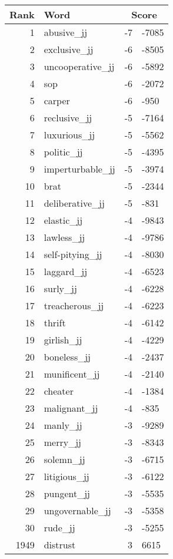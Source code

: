 \begin{longtable}[!htbp]{| rlr@{.}l |}
    \hline
    \textbf{Rank} & \textbf{Word} & \multicolumn{2}{c|}{\textbf{Score}} \\
    \hline
    \endhead
    1 & abusive\_jj & -7 & -7085 \\
    2 & exclusive\_jj & -6 & -8505 \\
    3 & uncooperative\_jj & -6 & -5892 \\
    4 & sop & -6 & -2072 \\
    5 & carper & -6 & -950 \\
    6 & reclusive\_jj & -5 & -7164 \\
    7 & luxurious\_jj & -5 & -5562 \\
    8 & politic\_jj & -5 & -4395 \\
    9 & imperturbable\_jj & -5 & -3974 \\
    10 & brat & -5 & -2344 \\
    11 & deliberative\_jj & -5 & -831 \\
    12 & elastic\_jj & -4 & -9843 \\
    13 & lawless\_jj & -4 & -9786 \\
    14 & self-pitying\_jj & -4 & -8030 \\
    15 & laggard\_jj & -4 & -6523 \\
    16 & surly\_jj & -4 & -6228 \\
    17 & treacherous\_jj & -4 & -6223 \\
    18 & thrift & -4 & -6142 \\
    19 & girlish\_jj & -4 & -4229 \\
    20 & boneless\_jj & -4 & -2437 \\
    21 & munificent\_jj & -4 & -2140 \\
    22 & cheater & -4 & -1384 \\
    23 & malignant\_jj & -4 & -835 \\
    24 & manly\_jj & -3 & -9289 \\
    25 & merry\_jj & -3 & -8343 \\
    26 & solemn\_jj & -3 & -6715 \\
    27 & litigious\_jj & -3 & -6122 \\
    28 & pungent\_jj & -3 & -5535 \\
    29 & ungovernable\_jj & -3 & -5358 \\
    30 & rude\_jj & -3 & -5255 \\
    1949 & distrust & 3 & 6615 \\

\end{longtable}
